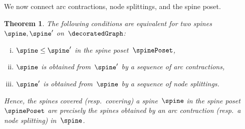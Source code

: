 \documentclass{amsart}
\newtheorem{theorem}{Theorem}[section]
\theoremstyle{definition}
\begin{document}
We now connect arc contractions, node splittings, and the spine poset.

\begin{theorem}
  \label{thm:spinePoset}
  The following conditions are equivalent for two spines~$\spine, \spine'$ on~$\decoratedGraph$:
  \begin{enumerate}[(i)]
  \item $\spine \le \spine'$ in the spine poset~$\spinePoset$,
  \item $\spine$ is obtained from~$\spine'$ by a sequence of arc contractions,
  \item $\spine'$ is obtained from~$\spine$ by a sequence of node splittings.
  \end{enumerate}
  Hence, the spines covered (resp.~covering) a spine~$\spine$ in the spine poset~$\spinePoset$ are precisely the spines obtained by an arc contraction (resp.~a node splitting) in~$\spine$.
\end{theorem}
\end{document}
